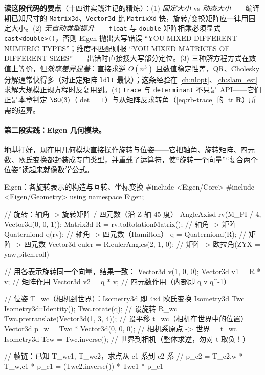 \noindent\textbf{读这段代码的要点}（十四讲实践注记的精炼）：(1) \emph{固定大小} vs \emph{动态大小}——编译期已知尺寸的 \texttt{Matrix3d}、\texttt{Vector3d} 比 \texttt{MatrixXd} 快，旋转/变换矩阵应一律用固定大小。(2) \emph{无自动类型提升}——\texttt{float} 与 \texttt{double} 矩阵相乘必须显式 \texttt{cast<double>()}，否则 Eigen 抛出大写错误 “YOU MIXED DIFFERENT NUMERIC TYPES”；维度不匹配则报 “YOU MIXED MATRICES OF DIFFERENT SIZES”——出错时直接搜大写部分定位。(3) 三种解方程方式在数值上等价，但\emph{效率差异显著}：直接求逆 $O(n^3)$ 且数值稳定性差，QR、Cholesky 分解通常快得多（对正定矩阵 \texttt{ldlt} 最快）；这条经验在 \cref{ch:nlopt}、\cref{ch:slam_est} 求解大规模正规方程时反复用到。(4) \texttt{trace} 与 \texttt{determinant} 不只是 API——它们正是本章判定 $\SO(3)$（$\det=1$）与从矩阵反求转角（\cref{eq:rb-trace} 的 $\operatorname{tr}\mathbf{R}$）所需的运算。

\paragraph{第二段实践：Eigen 几何模块。}地基打好，现在用几何模块直接操作旋转与位姿——它把轴角、旋转矩阵、四元数、欧氏变换都封装成专门类型，并重载了运算符，使“旋转一个向量”“复合两个位姿”读起来就像数学公式。

\begin{codebox}[C++]{Eigen：各旋转表示的构造与互转、坐标变换}
#include <Eigen/Core>
#include <Eigen/Geometry>
using namespace Eigen;

// 旋转：轴角 -> 旋转矩阵 / 四元数（沿 Z 轴 45 度）
AngleAxisd rv(M_PI / 4, Vector3d(0, 0, 1));
Matrix3d   R = rv.toRotationMatrix();         // 轴角 -> 矩阵
Quaterniond q(rv);                            // 轴角 -> 四元数（Hamilton）
q = Quaterniond(R);                           // 矩阵 -> 四元数
Vector3d euler = R.eulerAngles(2, 1, 0);      // 矩阵 -> 欧拉角(ZYX = yaw,pitch,roll)

// 用各表示旋转同一个向量，结果一致：
Vector3d v(1, 0, 0);
Vector3d v1 = R * v;                           // 矩阵作用
Vector3d v2 = q * v;                           // 四元数作用（内部即 q v q^-1）

// 位姿 T_wc（相机到世界）：Isometry3d 即 4x4 欧氏变换
Isometry3d Twc = Isometry3d::Identity();
Twc.rotate(q);                                 // 设旋转 R_wc
Twc.pretranslate(Vector3d(1, 3, 4));           // 设平移 t_wc（相机在世界中的位置）
Vector3d p_w = Twc * Vector3d(0, 0, 0);        // 相机系原点 -> 世界 = t_wc
Isometry3d Tcw = Twc.inverse();                // 世界到相机（整体求逆，勿对 t 取负！）

// 帧链：已知 T_wc1, T_wc2，求点从 c1 系到 c2 系
// p_c2 = T_c2,w * T_w,c1 * p_c1 = (Twc2.inverse()) * Twc1 * p_c1
\end{codebox}

